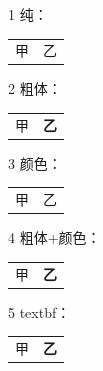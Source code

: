 ﻿\documentclass[11pt]{ctexart}
\begin{document}
1 纯：\par
\begin{tabular}{@{}lp{6cm}@{}}甲 & 乙 \\\end{tabular}

2 粗体：\par
\begin{tabular}{@{}lp{6cm}@{}}甲 & {\bfseries 乙} \\\end{tabular}

3 颜色：\par
\begin{tabular}{@{}lp{6cm}@{}}甲 & {\color{violet}乙} \\\end{tabular}

4 粗体+颜色：\par
\begin{tabular}{@{}lp{6cm}@{}}甲 & {\bfseries\color{violet}乙} \\\end{tabular}

5 textbf：\par
\begin{tabular}{@{}lp{6cm}@{}}甲 & \textbf{乙} \\\end{tabular}
\end{document}
